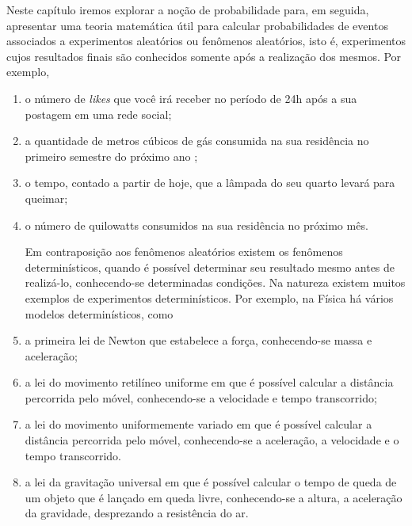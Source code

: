 \label{conceitosbasicos}
Neste capítulo iremos explorar a noção de probabilidade para, em seguida,  apresentar uma teoria matemática útil para calcular probabilidades de eventos associados a experimentos aleatórios ou fenômenos aleatórios, isto é, experimentos cujos resultados finais são conhecidos somente após a realização dos mesmos.
Por exemplo,
\begin{enumerate}
\item {} 
o número de \emph{likes} que você irá receber no período de 24h após a sua postagem em uma rede social;

\item {} 
a quantidade de metros cúbicos de gás consumida na sua residência no primeiro semestre do próximo ano ;

\item {} 
o tempo, contado a partir de hoje, que a lâmpada do seu quarto levará para queimar;

\item {} 
o número de quilowatts consumidos na sua residência no próximo mês.

Em contraposição aos fenômenos aleatórios existem os fenômenos determinísticos, quando é possível determinar seu resultado mesmo antes de realizá-lo, conhecendo-se determinadas condições. Na natureza existem muitos exemplos de experimentos determinísticos. Por exemplo, na Física há vários modelos determinísticos, como

\item {} 
a primeira lei de Newton que estabelece a força, conhecendo-se massa e aceleração;

\item {} 
a lei do movimento retilíneo uniforme em que é possível calcular a distância percorrida pelo móvel, conhecendo-se a velocidade e tempo transcorrido;

\item {} 
a lei do movimento uniformemente variado em que é possível calcular a distância percorrida pelo móvel, conhecendo-se a aceleração, a velocidade e o tempo transcorrido.

\item {} 
a lei da gravitação universal em que é possível calcular o tempo de queda de um objeto que é lançado em queda livre, conhecendo-se a altura, a aceleração da gravidade, desprezando a resistência do ar.

\end{enumerate}


